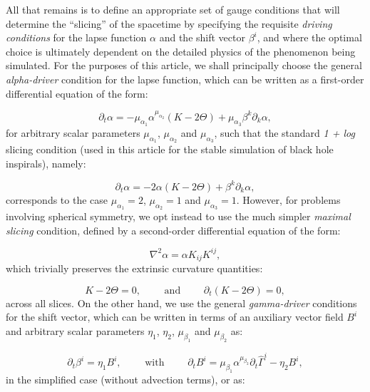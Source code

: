 \documentclass{article}
\begin{document}
All that remains is to define an appropriate set of gauge conditions that will determine the ``slicing'' of the  spacetime by specifying the requisite \textit{driving conditions} for the lapse function ${\alpha}$ and the shift vector ${\beta^i}$\cite{alcubierre}, and where the optimal choice is ultimately dependent on the detailed physics of the phenomenon being simulated. For the purposes of this article, we shall principally choose the general \textit{alpha-driver}\cite{balakrishna}\cite{bona4} condition for the lapse function, which can be written as a first-order differential equation of the form:

\begin{equation}
\partial_t \alpha = - \mu_{\alpha_1} \alpha^{\mu_{\alpha_2}} \left( K - 2 \Theta \right) + \mu_{\alpha_3} \beta^k \partial_k \alpha,
\end{equation}
for arbitrary scalar parameters ${\mu_{\alpha_1}}$, ${\mu_{\alpha_2}}$ and ${\mu_{\alpha_3}}$, such that the standard \textit{1 + log} slicing condition (used in this article for the stable simulation of black hole inspirals), namely:

\begin{equation}
\partial_t \alpha = -2 \alpha \left( K - 2 \Theta \right) + \beta^k \partial_k \alpha,
\end{equation}
corresponds to the case ${\mu_{\alpha_1} = 2}$, ${\mu_{\alpha_2} = 1}$ and ${\mu_{\alpha_3} = 1}$\cite{alcubierre2}. However, for problems involving spherical symmetry, we opt instead to use the much simpler \textit{maximal slicing} condition\cite{alcubierre3}\cite{alcubierre4}, defined by a second-order differential equation of the form:

\begin{equation}
\nabla^2 \alpha = \alpha K_{i j} K^{i j},
\end{equation}
which trivially preserves the extrinsic curvature quantities:

\begin{equation}
K - 2 \Theta = 0, \qquad \text{ and } \qquad \partial_t \left( K - 2 \Theta \right) = 0,
\end{equation}
across all slices. On the other hand, we use the general \textit{gamma-driver} conditions for the shift vector\cite{anninos}\cite{smarr}, which can be written in terms of an auxiliary vector field ${B^i}$ and arbitrary scalar parameters ${\eta_1}$, ${\eta_2}$, ${\mu_{\beta_1}}$ and ${\mu_{\beta_2}}$ as:

\begin{equation}
\partial_t \beta^i = \eta_1 B^i, \qquad \text{ with } \qquad \partial_t B^i = \mu_{\beta_1} \alpha^{\mu_{\beta_2}} \partial_t \hat{\Gamma}^i - \eta_2 B^i,
\end{equation}
in the simplified case (without advection terms), or as:
\end{document}
